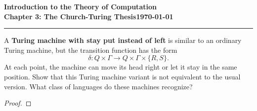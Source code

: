 \documentclass[11pt]{article}
\newcommand{\dated}{\today}
\begin{document}
\textbf{Introduction to the Theory of
Computation}\hfill\textbf{\myname}\\[0.01in]
\textbf{Chapter 3: The Church-Turing Thesis}\hfill\textbf{\dated}\\
\smallskip\hrule\bigskip

\begin{problem}{3.13}
A \textbf{Turing machine with stay put instead of left} is similar to an ordinary Turing machine, but the transition function has the form
\[
\delta : Q \times \Gamma \longrightarrow Q \times \Gamma \times \{R, S\}.
\]
At each point, the machine can move its head right or let it stay in the same position. Show that this Turing machine variant is not equivalent to the usual version. What class of languages do these machines recognize?
\end{problem}

\begin{proof}
\end{proof}
\end{document}
